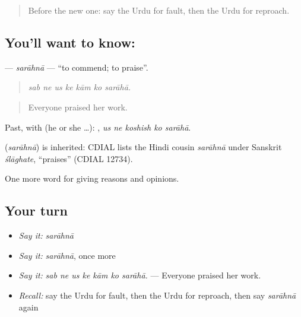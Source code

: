 \begin{quote}
Before the new one: say the Urdu for fault, then the Urdu for reproach.
\end{quote}

\subsection*{You'll want to know: }
\textbf{} — \emph{sarāhnā} — \textquotedblleft{}to commend; to praise\textquotedblright{}.

\begin{quote}
      
\end{quote}

\begin{quote}
\emph{sab ne us ke kām ko sarāhā.}
\end{quote}

\begin{quote}
Everyone praised her work.
\end{quote}

Past, with  (he or she …):     , \emph{us ne koshish ko sarāhā}.

\begin{cousinweb}
\textbf{} (\emph{sarāhnā}) is inherited: CDIAL lists the Hindi cousin \emph{sarāhnā} under Sanskrit \emph{ślāghate}, \textquotedblleft{}praises\textquotedblright{} (CDIAL 12734).
\end{cousinweb}

\begin{grammarlens}[title={What you've built}]
One more word for giving reasons and opinions.
\end{grammarlens}

\subsection*{Your turn}
\begin{itemize}
\raggedright
  \item \emph{Say it:} \emph{sarāhnā}
  \item \emph{Say it:} \emph{sarāhnā}, once more
  \item \emph{Say it:} \emph{sab ne us ke kām ko sarāhā.} — Everyone praised her work.
  \item \emph{Recall:} say the Urdu for fault, then the Urdu for reproach, then say \emph{sarāhnā} again
\end{itemize}

